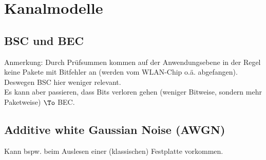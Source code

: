 \section{Kanalmodelle}
\subsection{BSC und BEC}
Anmerkung: Durch Prüfsummen kommen auf der Anwendungsebene in der Regel keine Pakete mit Bitfehler an (werden vom WLAN-Chip o.ä. abgefangen). Deswegen BSC hier weniger relevant.\\
Es kann aber passieren, dass Bits verloren gehen (weniger Bitweise, sondern mehr Paketweise) $\To$ BEC.
\subsection{Additive white Gaussian Noise (AWGN)}
Kann bspw. beim Auslesen einer (klassischen) Festplatte vorkommen.




